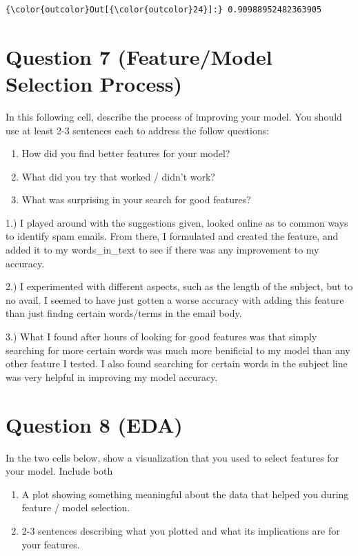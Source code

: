\documentclass[11pt]{article}
\providecommand{\tightlist}{%
      \setlength{\itemsep}{0pt}\setlength{\parskip}{0pt}}
\begin{document}
\begin{Verbatim}[commandchars=\\\{\}]
{\color{outcolor}Out[{\color{outcolor}24}]:} 0.90988952482363905
\end{Verbatim}
            
    \section{Question 7 (Feature/Model Selection
Process)}\label{question-7-featuremodel-selection-process}

In this following cell, describe the process of improving your model.
You should use at least 2-3 sentences each to address the follow
questions:

\begin{enumerate}
\def\labelenumi{\arabic{enumi}.}
\tightlist
\item
  How did you find better features for your model?
\item
  What did you try that worked / didn't work?
\item
  What was surprising in your search for good features?
\end{enumerate}

    1.) I played around with the suggestions given, looked online as to
common ways to identify spam emails. From there, I formulated and
created the feature, and added it to my words\_in\_text to see if there
was any improvement to my accuracy.

2.) I experimented with different aspects, such as the length of the
subject, but to no avail. I seemed to have just gotten a worse accuracy
with adding this feature than just findng certain words/terms in the
email body.

3.) What I found after hours of looking for good features was that
simply searching for more certain words was much more benificial to my
model than any other feature I tested. I also found searching for
certain words in the subject line was very helpful in improving my model
accuracy.

    \section{Question 8 (EDA)}\label{question-8-eda}

In the two cells below, show a visualization that you used to select
features for your model. Include both

\begin{enumerate}
\def\labelenumi{\arabic{enumi}.}
\tightlist
\item
  A plot showing something meaningful about the data that helped you
  during feature / model selection.
\item
  2-3 sentences describing what you plotted and what its implications
  are for your features.
\end{enumerate}
\end{document}
